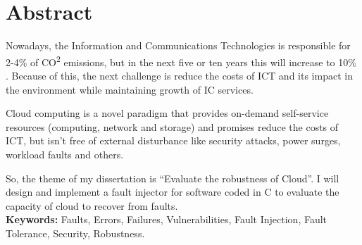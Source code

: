 \newpage
{}

\section*{Abstract}

Nowadays, the Information and Communications Technologies is responsible for 2-4\% of CO\textsuperscript{2} emissions, but in the next five or ten years this will increase to 10\% \cite{wolter2012resilience}. Because of this, the next challenge is reduce the costs of ICT and its impact in the environment while maintaining growth of IC services.


Cloud computing is a novel paradigm that provides on-demand self-service resources (computing, network and storage) and promises reduce the costs of ICT, but isn't free of external disturbance like security attacks, power surges, workload faults and others.

So, the theme of my dissertation is ``Evaluate the robustness of Cloud''. I will design and implement a fault injector for software coded in C to evaluate the capacity of cloud to recover from faults.\\





\textbf{Keywords:} Faults, Errors, Failures, Vulnerabilities, Fault Injection, Fault Tolerance, Security, Robustness.
